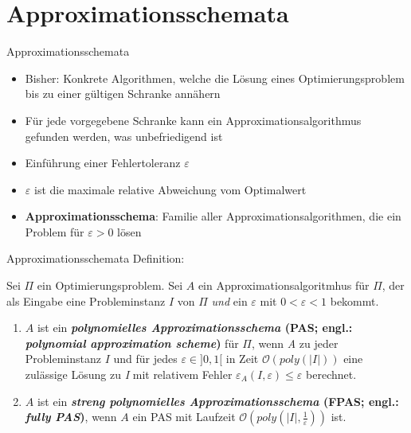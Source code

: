 \section{Approximationsschemata}
\begin{frame}{Approximationsschemata}


\begin{itemize}
\item Bisher: Konkrete Algorithmen, welche die Lösung eines Optimierungsproblem bis zu einer gültigen Schranke annähern
\item Für jede vorgegebene Schranke kann ein Approximationsalgorithmus gefunden werden, was unbefriedigend ist
\item Einführung einer Fehlertoleranz $\varepsilon$
\item $\varepsilon$ ist die maximale relative Abweichung vom Optimalwert
\item \textbf{Approximationsschema}: Familie aller Approximationsalgorithmen, die ein Problem für $\varepsilon > 0$ lösen
\end{itemize}
\end{frame}

\begin{frame}{Approximationsschemata}	
    Definition:
			
Sei $\Pi$ ein Optimierungsproblem. Sei $A$ ein Approximationsalgoritmhus für $\Pi$, der als Eingabe eine Probleminstanz $I$ von $\Pi$ \textit{und} ein $\varepsilon$ mit $0 < \varepsilon < 1$ bekommt.

\begin{enumerate}
\item
$A$ ist ein \textbf{\textit{polynomielles Approximationsschema} (PAS; engl.: \textit{polynomial approximation scheme})} für $\Pi$, wenn \textit{A} zu jeder Probleminstanz $I$ und für jedes $\varepsilon \in ] 0,1 [$ in Zeit $\mathcal O(poly(|I|))$ eine zulässige Lösung zu \textit{I} mit relativem Fehler $\varepsilon_A(\textit{I},\varepsilon) \le \varepsilon$ berechnet.

\item
$A$ ist ein \textbf{\textit{streng polynomielles Approximationsschema} (FPAS; engl.: \textit{fully PAS})}, wenn $A$ ein PAS mit Laufzeit $\mathcal O(poly(|I|, \frac{1}{\varepsilon}))$ ist.

\end{enumerate}		      
\end{frame}

